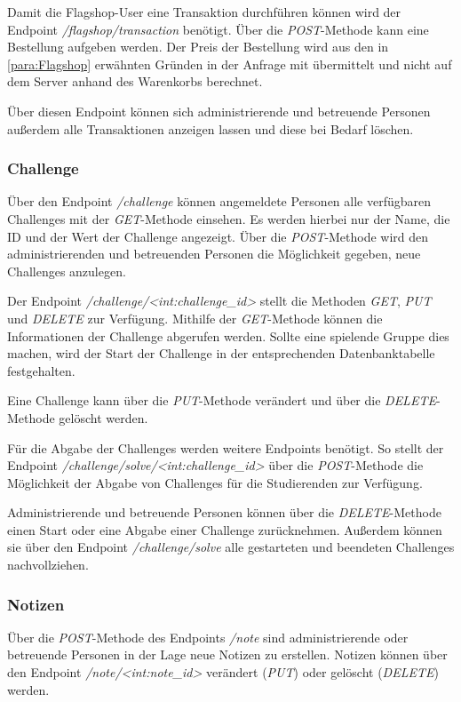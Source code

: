 Damit die Flagshop-User eine Transaktion durchführen können wird der Endpoint \linebreak\textit{/flagshop/transaction} benötigt. Über die \textit{POST}-Methode kann eine Bestellung aufgeben werden. Der Preis der Bestellung wird aus den in \autoref{para:Flagshop} erwähnten Gründen in der Anfrage mit übermittelt und nicht auf dem Server anhand des Warenkorbs berechnet.

Über diesen Endpoint können sich administrierende und betreuende Personen außerdem alle Transaktionen anzeigen lassen und diese bei Bedarf löschen.

\subsubsection{Challenge}
Über den Endpoint \textit{/challenge} können angemeldete Personen alle verfügbaren Challenges mit der \textit{GET}-Methode einsehen. Es werden hierbei nur der Name, die ID und der Wert der Challenge angezeigt. Über die \textit{POST}-Methode wird den administrierenden und betreuenden Personen die Möglichkeit gegeben, neue Challenges anzulegen.

Der Endpoint \textit{/challenge/<int:challenge\_id>} stellt die Methoden \textit{GET}, \textit{PUT} und \textit{DELETE} zur Verfügung. Mithilfe der \textit{GET}-Methode können die Informationen der Challenge abgerufen werden. Sollte eine spielende Gruppe dies machen, wird der Start der Challenge in der entsprechenden Datenbanktabelle festgehalten.

Eine Challenge kann über die \textit{PUT}-Methode verändert und über die \textit{DELETE}-Methode gelöscht werden.

Für die Abgabe der Challenges werden weitere Endpoints benötigt. So stellt der Endpoint \textit{/challenge/solve/<int:challenge\_id>} über die \textit{POST}-Methode die Möglichkeit der Abgabe von Challenges für die Studierenden zur Verfügung.

Administrierende und betreuende Personen können über die \textit{DELETE}-Methode einen Start oder eine Abgabe einer Challenge zurücknehmen. Außerdem können sie über den Endpoint \textit{/challenge/solve} alle gestarteten und beendeten Challenges nachvollziehen.

\subsubsection{Notizen}
Über die \textit{POST}-Methode des Endpoints \textit{/note} sind administrierende oder betreuende Personen in der Lage neue Notizen zu erstellen. Notizen können über den Endpoint \textit{/note/<int:note\_id>} verändert (\textit{PUT}) oder gelöscht (\textit{DELETE}) werden.


